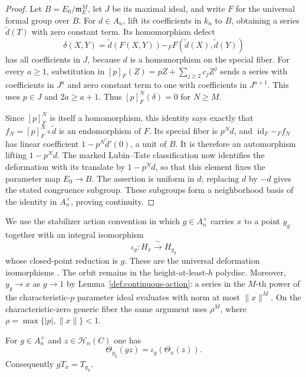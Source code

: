 \begin{proof}
Let $B=E_0/\mathfrak m_E^M$, let $J$ be its maximal ideal, and
write $F$ for the universal formal group over $B$.
For $d\in A_n$, lift its coefficients in $k_n$ to $B$, obtaining a
series $\widetilde d(T)$ with zero constant term.  Its homomorphism
defect
\[
 \delta(X,Y)=\widetilde d(F(X,Y))
       -_F F(\widetilde d(X),\widetilde d(Y))
\]
has all coefficients in $J$, because $d$ is a homomorphism on the
special fiber.  For every $a\geq1$, substitution in
$[p]_F(Z)=pZ+\sum_{j\geq2}c_jZ^j$ sends a series with coefficients
in $J^a$ and zero constant term to one with coefficients in
$J^{a+1}$.  This uses $p\in J$ and $2a\geq a+1$.
Thus $[p]_F^N(\delta)=0$ for $N\geq M$.

Since $[p]_F^N$ is itself a homomorphism, this identity says exactly
that $f_N=[p]_F^N\circ\widetilde d$ is an endomorphism of $F$.
Its special fiber is $p^Nd$, and
$\operatorname{id}_F-_F f_N$ has linear coefficient
$1-p^N\widetilde d'(0)$, a unit of $B$.
It is therefore an automorphism lifting $1-p^Nd$.
The marked Lubin--Tate classification now identifies the deformation
with its translate by $1-p^Nd$, so that this element fixes the
parameter map $E_0\to B$.
The assertion is uniform in $d$; replacing $d$ by $-d$ gives the
stated congruence subgroup.  These subgroups form a neighborhood basis
of the identity in $A_n^\times$, proving continuity.
\end{proof}

We use the stabilizer action convention
in which $g\in A_n^\times$ carries $x$ to a point $y_g$ together with an
integral isomorphism
\[
 \iota_g:H_x\xrightarrow{\ \sim\ }H_{y_g}
\]
whose closed-point reduction is $g$.
These are the universal deformation isomorphisms
\cite[Section~3.4]{LT66}.  The orbit remains in the height-at-least-$h$
polydisc.  Moreover, $y_g\to x$ as $g\to1$ by
Lemma~\ref{def:continuous-action}: a series in the $M$-th power of the
characteristic-$p$ parameter ideal evaluates with norm at most
$\|x\|^M$.  On the characteristic-zero generic fiber the same argument
uses $\rho^M$, where $\rho=\max\{|p|,\|x\|\}<1$.

\begin{lemma}\label{def:stabilizer}
For $g\in A_n^\times$ and $z\in\mathcal H_n(C)$ one has
\begin{equation}
 \Theta_{y_g}(gz)=\iota_g(\Theta_x(z)).
 \label{def:orbit-transport}
\end{equation}
Consequently $gT_x=T_{y_g}$.
\end{lemma}

